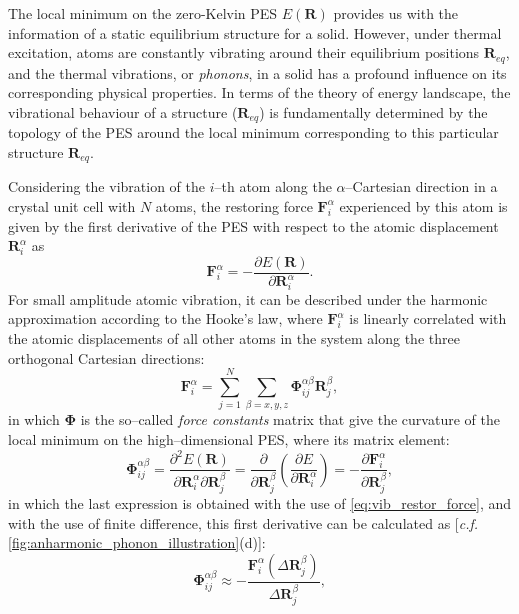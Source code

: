
The local minimum on the zero-Kelvin PES $E(\bm{R})$ provides us with the information of a static equilibrium structure for a solid. However, under thermal excitation, atoms are constantly vibrating around their equilibrium positions $\bm{R}_{eq}$, and the thermal vibrations, or \emph{phonons}, in a solid has a profound influence on its corresponding physical properties. In terms of the theory of energy landscape, the vibrational behaviour of a structure ($\bm{R}_{eq}$) is fundamentally determined by the topology of the PES around the local minimum corresponding to this particular structure $\bm{R}_{eq}$.

Considering  the vibration of the $i$--th atom along the $\alpha$--Cartesian direction in a crystal unit cell with $N$ atoms, the restoring force $\bm{F}_{i}^{\alpha}$ experienced by this atom is given by the first derivative of the PES with respect to the atomic displacement $\bm{R}_{i}^{\alpha}$ as 
\begin{equation}\label{eq:vib_restor_force}
    \bm{F}_{i}^{\alpha}=-\frac{\partial E(\bm{R})}{\partial \bm{R}_{i}^{\alpha}}.
\end{equation}
For small amplitude atomic vibration, it can be described under the harmonic approximation according to the Hooke's law, where $\bm{F}_{i}^{\alpha}$ is linearly correlated with the atomic displacements of all other atoms in the system along the three orthogonal Cartesian directions:
\begin{equation}\label{eq:harmonic_forces}
     \bm{F}_{i}^{\alpha}=\sum_{j=1}^{N}\sum_{\beta=x,y,z}\bm{\Phi}_{ij}^{\alpha\beta}\bm{R}_{j}^{\beta},
\end{equation}
in which $\bm{\Phi}$ is the so--called \emph{force constants} matrix that give the curvature of the local minimum on the high--dimensional PES, where its matrix element:\cite{chaput2011phonon}
\begin{equation}\label{eq:force_constant}
    \bm{\Phi}_{ij}^{\alpha\beta}=\frac{\partial^{2}E(\bm{R})}{\partial \bm{R}^{\alpha}_{i}\partial \bm{R}^{\beta}_{j}}=\frac{\partial}{\partial \bm{R}_{j}^{\beta}}\left(\frac{\partial E}{\partial \bm{R}_{i}^{\alpha}}\right)=-\frac{\partial \bm{F}_{i}^{\alpha}}{\partial \bm{R}_{j}^{\beta}},
\end{equation}
in which the last expression is obtained with the use of \cref{eq:vib_restor_force}, and with the use of finite difference, this first derivative can be calculated as [\emph{c.f.} \cref{fig:anharmonic_phonon_illustration}(d)]:
\begin{equation}\label{eq:FC_finite_difference}
\bm{\Phi}_{ij}^{\alpha\beta}\approx -\frac{\bm{F}_{i}^{\alpha}(\Delta\bm{R}_{j}^{\beta})}{\Delta\bm{R}_{j}^{\beta}},
\end{equation}
